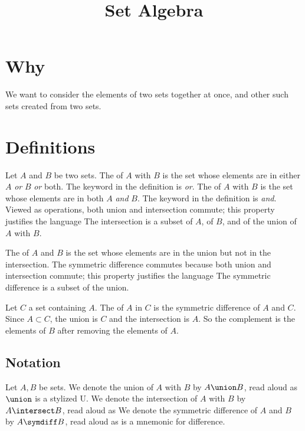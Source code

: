 






\title{Set Algebra}

\section{Why}

We want to consider the elements of two sets together at once, and other such sets created from two sets.

\section{Definitions}

Let $A$ and $B$ be two sets.
The  of $A$ with $B$ is the set whose elements are in either $A$ \textit{or} $B$ \textit{or} both.
The keyword in the definition is \textit{or}.
The  of $A$ with $B$ is the set whose elements are in both $A$ \textit{and} $B$.
The keyword in the definition is \textit{and}.
Viewed as operations, both union and intersection commute; this property justifies the language 
The intersection is a subset of $A$, of $B$, and of the union of $A$ with $B$.

The  of $A$ and $B$ is the set whose elements are in the union but not in the intersection.
The symmetric difference commutes because both union and intersection commute; this property justifies the language 
The symmetric difference is a subset of the union.


Let $C$ a set containing $A$.
The  of $A$ in $C$ is the symmetric difference of $A$ and $C$.
Since $A \subset C$, the union is $C$ and the intersection is $A$.
So the complement is the  elements of $B$ after removing the elements of $A$.

\subsection{Notation}

Let $A, B$ be sets.
We denote the union of $A$ with $B$ by $A \union B$, read aloud as 
$\union$ is a stylized U.
We denote the intersection of $A$ with $B$ by $A \intersect B$, read aloud as 
We denote the symmetric difference of $A$ and $B$ by $A \symdiff B$, read aloud as 
 is a mnemonic for difference.

